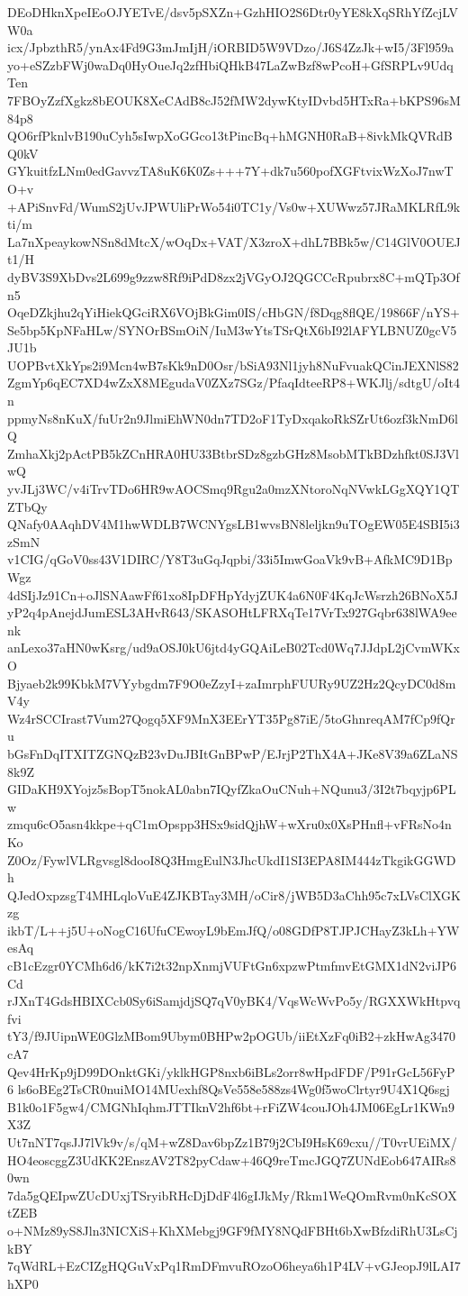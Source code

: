 DEoDHknXpeIEoOJYETvE/dsv5pSXZn+GzhHIO2S6Dtr0yYE8kXqSRhYfZcjLVW0a
icx/JpbzthR5/ynAx4Fd9G3mJmIjH/iORBID5W9VDzo/J6S4ZzJk+wI5/3Fl959a
yo+eSZzbFWj0waDq0HyOueJq2zfHbiQHkB47LaZwBzf8wPcoH+GfSRPLv9UdqTen
7FBOyZzfXgkz8bEOUK8XeCAdB8cJ52fMW2dywKtyIDvbd5HTxRa+bKPS96sM84p8
QO6rfPknlvB190uCyh5sIwpXoGGco13tPincBq+hMGNH0RaB+8ivkMkQVRdBQ0kV
GYkuitfzLNm0edGavvzTA8uK6K0Zs+++7Y+dk7u560pofXGFtvixWzXoJ7nwTO+v
+APiSnvFd/WumS2jUvJPWUliPrWo54i0TC1y/Vs0w+XUWwz57JRaMKLRfL9kti/m
La7nXpeaykowNSn8dMtcX/wOqDx+VAT/X3zroX+dhL7BBk5w/C14GlV0OUEJt1/H
dyBV3S9XbDvs2L699g9zzw8Rf9iPdD8zx2jVGyOJ2QGCCcRpubrx8C+mQTp3Ofn5
OqeDZkjhu2qYiHiekQGciRX6VOjBkGim0IS/cHbGN/f8Dqg8flQE/19866F/nYS+
Se5bp5KpNFaHLw/SYNOrBSmOiN/IuM3wYtsTSrQtX6bI92lAFYLBNUZ0gcV5JU1b
UOPBvtXkYps2i9Mcn4wB7sKk9nD0Osr/bSiA93Nl1jyh8NuFvuakQCinJEXNlS82
ZgmYp6qEC7XD4wZxX8MEgudaV0ZXz7SGz/PfaqIdteeRP8+WKJlj/sdtgU/oIt4n
ppmyNs8nKuX/fuUr2n9JlmiEhWN0dn7TD2oF1TyDxqakoRkSZrUt6ozf3kNmD6lQ
ZmhaXkj2pActPB5kZCnHRA0HU33BtbrSDz8gzbGHz8MsobMTkBDzhfkt0SJ3VlwQ
yvJLj3WC/v4iTrvTDo6HR9wAOCSmq9Rgu2a0mzXNtoroNqNVwkLGgXQY1QTZTbQy
QNafy0AAqhDV4M1hwWDLB7WCNYgsLB1wvsBN8leljkn9uTOgEW05E4SBI5i3zSmN
v1CIG/qGoV0ss43V1DIRC/Y8T3uGqJqpbi/33i5ImwGoaVk9vB+AfkMC9D1BpWgz
4dSIjJz91Cn+oJlSNAawFf61xo8IpDFHpYdyjZUK4a6N0F4KqJcWsrzh26BNoX5J
yP2q4pAnejdJumESL3AHvR643/SKASOHtLFRXqTe17VrTx927Gqbr638lWA9eenk
anLexo37aHN0wKsrg/ud9aOSJ0kU6jtd4yGQAiLeB02Tcd0Wq7JJdpL2jCvmWKxO
Bjyaeb2k99KbkM7VYybgdm7F9O0eZzyI+zaImrphFUURy9UZ2Hz2QcyDC0d8mV4y
Wz4rSCCIrast7Vum27Qogq5XF9MnX3EErYT35Pg87iE/5toGhnreqAM7fCp9fQru
bGsFnDqITXITZGNQzB23vDuJBItGnBPwP/EJrjP2ThX4A+JKe8V39a6ZLaNS8k9Z
GIDaKH9XYojz5sBopT5nokAL0abn7IQyfZkaOuCNuh+NQunu3/3I2t7bqyjp6PLw
zmqu6cO5asn4kkpe+qC1mOpspp3HSx9sidQjhW+wXru0x0XsPHnfl+vFRsNo4nKo
Z0Oz/FywlVLRgvsgl8dooI8Q3HmgEulN3JhcUkdI1SI3EPA8IM444zTkgikGGWDh
QJedOxpzsgT4MHLqloVuE4ZJKBTay3MH/oCir8/jWB5D3aChh95c7xLVsClXGKzg
ikbT/L++j5U+oNogC16UfuCEwoyL9bEmJfQ/o08GDfP8TJPJCHayZ3kLh+YWesAq
cB1cEzgr0YCMh6d6/kK7i2t32npXnmjVUFtGn6xpzwPtmfmvEtGMX1dN2viJP6Cd
rJXnT4GdsHBIXCcb0Sy6iSamjdjSQ7qV0yBK4/VqsWcWvPo5y/RGXXWkHtpvqfvi
tY3/f9JUipnWE0GlzMBom9Ubym0BHPw2pOGUb/iiEtXzFq0iB2+zkHwAg3470cA7
Qev4HrKp9jD99DOnktGKi/yklkHGP8nxb6iBLs2orr8wHpdFDF/P91rGcL56FyP6
ls6oBEg2TsCR0nuiMO14MUexhf8QsVe558e588zs4Wg0f5woClrtyr9U4X1Q6sgj
B1k0o1F5gw4/CMGNhIqhmJTTIknV2hf6bt+rFiZW4couJOh4JM06EgLr1KWn9X3Z
Ut7nNT7qsJJ7lVk9v/s/qM+wZ8Dav6bpZz1B79j2CbI9HsK69cxu//T0vrUEiMX/
HO4eoscggZ3UdKK2EnszAV2T82pyCdaw+46Q9reTmcJGQ7ZUNdEob647AIRs80wn
7da5gQEIpwZUcDUxjTSryibRHcDjDdF4l6gIJkMy/Rkm1WeQOmRvm0nKcSOXtZEB
o+NMz89yS8Jln3NICXiS+KhXMebgj9GF9fMY8NQdFBHt6bXwBfzdiRhU3LsCjkBY
7qWdRL+EzCIZgHQGuVxPq1RmDFmvuROzoO6heya6h1P4LV+vGJeopJ9lLAI7hXP0
